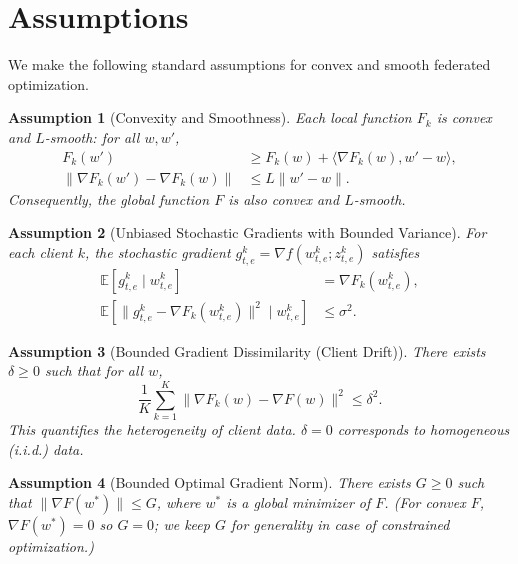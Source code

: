 \documentclass{article}
\newtheorem{assumption}{Assumption}
\begin{document}
\section*{Assumptions}
We make the following standard assumptions for convex and smooth federated optimization.

\begin{assumption}[Convexity and Smoothness]
Each local function $F_k$ is convex and $L$-smooth: for all $w, w'$,
\begin{align}
F_k(w') &\ge F_k(w) + \langle \nabla F_k(w), w' - w \rangle, \label{eq:convex} \\
\|\nabla F_k(w') - \nabla F_k(w)\| &\le L \|w' - w\|. \label{eq:smooth}
\end{align}
Consequently, the global function $F$ is also convex and $L$-smooth.
\end{assumption}

\begin{assumption}[Unbiased Stochastic Gradients with Bounded Variance]
For each client $k$, the stochastic gradient $g_{t,e}^k = \nabla f(w_{t,e}^k; z_{t,e}^k)$ satisfies
\begin{align}
\mathbb{E}[g_{t,e}^k \mid w_{t,e}^k] &= \nabla F_k(w_{t,e}^k), \label{eq:unbiased} \\
\mathbb{E}[\|g_{t,e}^k - \nabla F_k(w_{t,e}^k)\|^2 \mid w_{t,e}^k] &\le \sigma^2. \label{eq:variance}
\end{align}
\end{assumption}

\begin{assumption}[Bounded Gradient Dissimilarity (Client Drift)]
There exists $\delta \ge 0$ such that for all $w$,
\begin{equation}
\frac{1}{K}\sum_{k=1}^K \|\nabla F_k(w) - \nabla F(w)\|^2 \le \delta^2. \label{eq:drift}
\end{equation}
This quantifies the heterogeneity of client data. $\delta=0$ corresponds to homogeneous (i.i.d.) data.
\end{assumption}

\begin{assumption}[Bounded Optimal Gradient Norm]
There exists $G \ge 0$ such that $\|\nabla F(w^*)\| \le G$, where $w^*$ is a global minimizer of $F$. (For convex $F$, $\nabla F(w^*)=0$ so $G=0$; we keep $G$ for generality in case of constrained optimization.)
\end{assumption}
\end{document}
